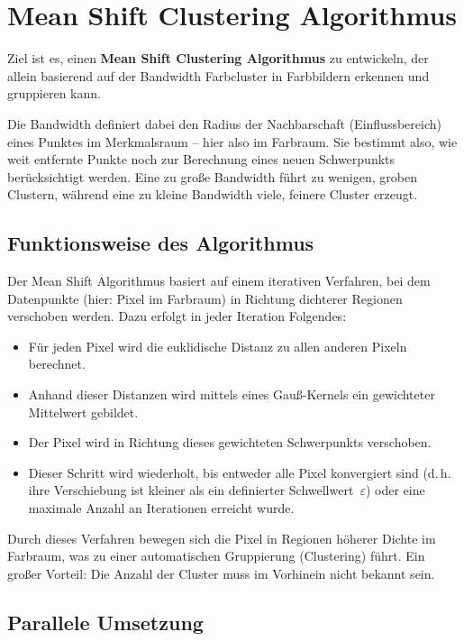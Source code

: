 \section{Mean Shift Clustering Algorithmus}

Ziel ist es, einen \textbf{Mean Shift Clustering Algorithmus} zu entwickeln, der allein basierend auf der Bandwidth Farbcluster in Farbbildern erkennen und gruppieren kann.

Die Bandwidth definiert dabei den Radius der Nachbarschaft (Einflussbereich) eines Punktes im Merkmalsraum – hier also im Farbraum. Sie bestimmt also, wie weit entfernte Punkte noch zur Berechnung eines neuen Schwerpunkts berücksichtigt werden. Eine zu große Bandwidth führt zu wenigen, groben Clustern, während eine zu kleine Bandwidth viele, feinere Cluster erzeugt.

\subsection*{Funktionsweise des Algorithmus}

Der Mean Shift Algorithmus basiert auf einem iterativen Verfahren, bei dem Datenpunkte (hier: Pixel im Farbraum) in Richtung dichterer Regionen verschoben werden. Dazu erfolgt in jeder Iteration Folgendes:


\begin{itemize}
    \item Für jeden Pixel wird die euklidische Distanz zu allen anderen Pixeln berechnet.
    \item Anhand dieser Distanzen wird mittels eines Gauß-Kernels ein gewichteter Mittelwert gebildet.
    \item Der Pixel wird in Richtung dieses gewichteten Schwerpunkts verschoben.
    \item Dieser Schritt wird wiederholt, bis entweder alle Pixel konvergiert sind (d.\,h. ihre Verschiebung ist kleiner als ein definierter Schwellwert~$\varepsilon$) oder eine maximale Anzahl an Iterationen erreicht wurde.
\end{itemize}

Durch dieses Verfahren bewegen sich die Pixel in Regionen höherer Dichte im Farbraum, was zu einer automatischen Gruppierung (Clustering) führt. Ein großer Vorteil: Die Anzahl der Cluster muss im Vorhinein nicht bekannt sein.

\subsection*{Parallele Umsetzung}

